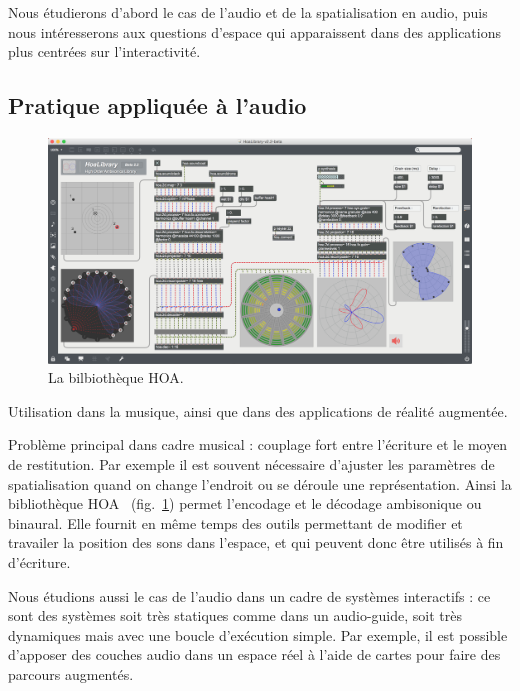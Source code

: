 \documentclass[french,12pt]{article}
\begin{document}
Nous étudierons d'abord le cas de l'audio et de la spatialisation en audio, puis nous intéresserons aux questions d'espace qui apparaissent dans des applications plus centrées sur l'interactivité.

\subsection{Pratique appliquée à l'audio}
\begin{figure}[h]
    \centering
    \includegraphics[scale=0.25]{images/hoalibrary.png}
    \caption{La bilbiothèque HOA.}
    \label{fig.hoalib}
\end{figure}

Utilisation dans la musique, ainsi que dans des applications de réalité augmentée.

Problème principal dans cadre musical : couplage fort entre l'écriture et le moyen de restitution. 
Par exemple il est souvent nécessaire d'ajuster les paramètres de spatialisation quand on change l'endroit ou se déroule une représentation. %
Ainsi la bibliothèque HOA~\cite{colafrancesco_bibliotheque_2013} (fig.~\ref{fig.hoalib}) permet l'encodage et le décodage ambisonique ou binaural. 
Elle fournit en même temps des outils permettant de modifier et travailer la position des sons dans l'espace, et qui peuvent donc être utilisés à fin d'écriture.

Nous étudions aussi le cas de l'audio dans un cadre de systèmes interactifs : ce sont des systèmes soit très statiques comme dans un audio-guide, soit très dynamiques mais avec une boucle d'exécution simple.
Par exemple, il est possible d'apposer des couches audio dans un espace réel à l'aide de cartes pour faire des parcours\cite{lemordant_augmented_2010} augmentés. 
\end{document}
